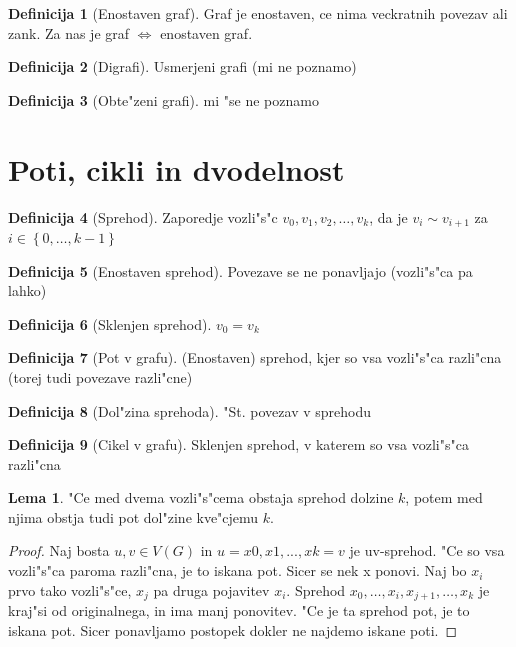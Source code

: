 \documentclass{article}
\theoremstyle{definition}
\newtheorem{definition}{Definicija}[section]
\newtheorem{lemma}{Lema}[section]
\begin{document}
	\begin{definition}[Enostaven graf]
		Graf je enostaven, ce nima veckratnih povezav ali zank. Za nas je graf $\iff$ enostaven graf.
	\end{definition}
	\begin{definition}[Digrafi]
		Usmerjeni grafi (mi ne poznamo)
	\end{definition}
	\begin{definition}[Obte"zeni grafi]
		mi "se ne poznamo
	\end{definition}
	
\section{Poti, cikli in dvodelnost}
	\begin{definition}[Sprehod]
		Zaporedje vozli"s"c $v_0,v_1,v_2,\ldots,v_k$, da je $v_i \sim v_{i+1}$ za $i \in \left\lbrace 0, \ldots, k-1 \right\rbrace $ 
	\end{definition}
	\begin{definition}[Enostaven sprehod]
		Povezave se ne ponavljajo (vozli"s"ca pa lahko)
	\end{definition}
	\begin{definition}[Sklenjen sprehod]
		$v_0 = v_k$
	\end{definition}
	\begin{definition}[Pot v grafu]
		(Enostaven) sprehod, kjer so vsa vozli"s"ca razli"cna (torej tudi povezave razli"cne)
	\end{definition}
	\begin{definition}[Dol"zina sprehoda]
		"St. povezav v sprehodu
	\end{definition}
	\begin{definition}[Cikel v grafu]
		Sklenjen sprehod, v katerem so vsa vozli"s"ca razli"cna
	\end{definition}

	\begin{lemma}
		"Ce med dvema vozli"s"cema obstaja sprehod dolzine $k$, potem med njima obstja tudi pot dol"zine kve"cjemu $k$.
		\begin{proof}
			Naj bosta $u,v \in V(G)$ in $u=x0,x1,...,xk=v$ je uv-sprehod. "Ce so vsa vozli"s"ca paroma razli"cna, je to iskana pot. Sicer se nek x ponovi. Naj bo $x_i$ prvo tako vozli"s"ce, $x_j$ pa druga pojavitev $x_i$. Sprehod $x_0, \ldots, x_i, x_{j+1}, \ldots, x_k$ je kraj"si od originalnega, in ima manj ponovitev. "Ce je ta sprehod pot, je to iskana pot. Sicer ponavljamo postopek dokler ne najdemo iskane poti.
		\end{proof}
	\end{lemma}
	
\end{document}
